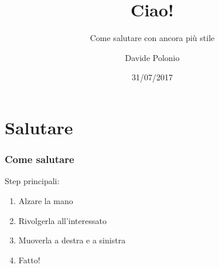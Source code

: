 \documentclass{beamer}
\title{Ciao!}
\subtitle{Come salutare con ancora più stile}
\date{31/07/2017}
\author{Davide Polonio}
\institute{Università degli studi di Padova}
\begin{document}
 \begin{frame}
  \maketitle
 \end{frame}

 \section{Salutare}
 \begin{frame} %
  \frametitle{Come salutare} %
  Step principali:
  \begin{enumerate} %
   \item<1-> Alzare la mano
   \item<2-> Rivolgerla all'interessato
   \item<3-> Muoverla a destra e a sinistra
   \item<4-> Fatto!
  \end{enumerate}
 \end{frame}
\end{document}
